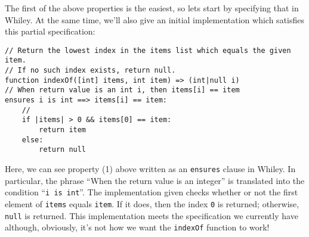 The first of the above properties is the easiest, so lets start by
specifying that in Whiley.  At the same time, we'll also give an
initial implementation which satisfies this partial specification:

\begin{lstlisting}
// Return the lowest index in the items list which equals the given item.
// If no such index exists, return null.
function indexOf([int] items, int item) => (int|null i)
// When return value is an int i, then items[i] == item
ensures i is int ==> items[i] == item:
    //
    if |items| > 0 && items[0] == item:
        return item
    else:
        return null
\end{lstlisting}

Here, we can see property (1) above written as an \lstinline{ensures}
clause in Whiley.  In particular, the phrase ``When the return value
is an integer'' is translated into the condition ``\lstinline{i is int}''.  The implementation given checks whether or not the
first element of \lstinline{items} equals \lstinline{item}.  If it
does, then the index \lstinline{0} is returned; otherwise,
\lstinline{null} is returned.  This implementation meets the
specification we currently have although, obviously, it's not how we want the
\lstinline{indexOf} function to work!



